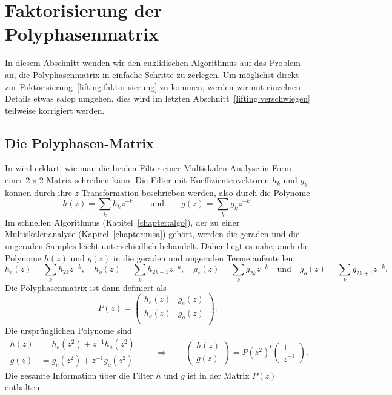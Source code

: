 %
%
\section{Faktorisierung der Polyphasenmatrix}
In diesem Abschnitt wenden wir den euklidischen Algorithmus auf das
Problem an, die Polyphasenmatrix in einfache Schritte zu zerlegen.
Um möglichst direkt zur Faktorisierung~\eqref{lifting:faktorisierung}
zu kommen, werden wir mit einzelnen Details etwas salop umgehen, dies wird
im letzten Abschnitt~\ref{lifting:verschwiegen} teilweise korrigiert werden.

\subsection{Die Polyphasen-Matrix}
In \cite{fpga:Daubechies1998} wird erklärt, wie man die beiden
Filter einer Multiskalen-Analyse in Form einer $2\times 2$-Matrix
schreiben kann.
Die Filter mit Koeffizientenvektoren $h_k$ und $g_k$ können durch 
ihre $z$-Transformation beschrieben werden, also durch die Polynome
\[
h(z) = \sum_{k} h_kz^{-k}
\qquad\text{und}\qquad
g(z) = \sum_{k} g_kz^{-k}.
\]
Im schnellen Algorithmus (Kapitel~\ref{chapter:algo}), der zu einer
Multiskalenanalyse (Kapitel~\ref{chapter:msa}) gehört, werden die
geraden und die ungeraden Samples leicht unterschiedlich behandelt.
Daher liegt es nahe, auch die Polynome $h(z)$ und $g(z)$ in die
geraden und ungeraden Terme aufzuteilen:
\[
h_e(z) = \sum_k h_{2k}z^{-k},
\quad
h_o(z) = \sum_k h_{2k+1}z^{-k},
\quad
g_e(z) = \sum_k g_{2k}z^{-k}
\quad\text{und}\quad
g_o(z) = \sum_k g_{2k+1}z^{-k}.
\]
Die Polyphasenmatrix ist dann definiert als
\[
P(z)
=
\begin{pmatrix}
h_e(z)&g_e(z)\\
h_o(z)&g_o(z)\\
\end{pmatrix}.
\]
Die ursprünglichen Polynome sind
\[
\begin{aligned}
h(z) &= h_e(z^2) + z^{-1}h_o(z^2)\\
g(z) &= g_e(z^2) + z^{-1}g_o(z^2)
\end{aligned}
\qquad\Rightarrow\qquad
\begin{pmatrix}
h(z)\\
g(z)
\end{pmatrix}
=
P(z^2)^t
\begin{pmatrix} 1\\ z^{-1} \end{pmatrix}.
\]
Die gesamte Information über die Filter $h$ und $g$ ist in der Matrix
$P(z)$ enthalten.

